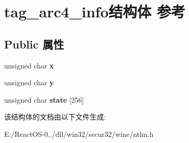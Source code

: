 \hypertarget{structtag__arc4__info}{}\section{tag\+\_\+arc4\+\_\+info结构体 参考}
\label{structtag__arc4__info}
\subsection*{Public 属性}
\begin{DoxyCompactItemize}
\item 
\mbox{\label{structtag__arc4__info_a741420b46929d4dd115ffd68c1c87f32}} 
unsigned char {\bfseries x}
\item 
\mbox{\label{structtag__arc4__info_a8efe158a193b87b935269854cc1296d2}} 
unsigned char {\bfseries y}
\item 
\mbox{\label{structtag__arc4__info_affb3c01cdef8ecbfb3733689c98c3c9e}} 
unsigned char {\bfseries state} \mbox{[}256\mbox{]}
\end{DoxyCompactItemize}


该结构体的文档由以下文件生成\+:\begin{DoxyCompactItemize}
\item 
E\+:/\+React\+O\+S-\/0../dll/win32/secur32/wine/ntlm.\+h\end{DoxyCompactItemize}
